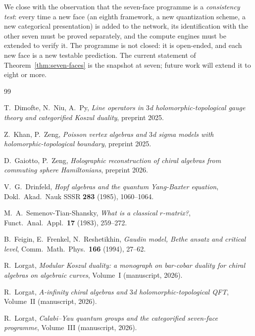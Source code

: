 \documentclass[11pt]{article}
\theoremstyle{plain}
\theoremstyle{definition}
\theoremstyle{remark}
\begin{document}
We close with the observation that the seven-face programme is a
\emph{consistency test}: every time a new face (an eighth framework,
a new quantization scheme, a new categorical presentation) is
added to the network, its identification with the other seven must
be proved separately, and the compute engines must be extended to
verify it. The programme is not closed: it is open-ended, and
each new face is a new testable prediction. The current
statement of Theorem~\ref{thm:seven-faces} is the snapshot at
seven; future work will extend it to eight or more.


\begin{thebibliography}{99}

T.~Dimofte, N.~Niu, A.~Py, \emph{Line operators in $3$d
holomorphic-topological gauge theory and categorified Koszul
duality}, preprint 2025.

Z.~Khan, P.~Zeng, \emph{Poisson vertex algebras and $3$d sigma
models with holomorphic-topological boundary}, preprint 2025.

D.~Gaiotto, P.~Zeng, \emph{Holographic reconstruction of chiral
algebras from commuting sphere Hamiltonians}, preprint 2026.

V.~G.~Drinfeld, \emph{Hopf algebras and the quantum Yang-Baxter
equation}, Dokl.\ Akad.\ Nauk SSSR \textbf{283} (1985), 1060--1064.

M.~A.~Semenov-Tian-Shansky, \emph{What is a classical $r$-matrix?},
Funct.\ Anal.\ Appl.\ \textbf{17} (1983), 259--272.

B.~Feigin, E.~Frenkel, N.~Reshetikhin, \emph{Gaudin model, Bethe
ansatz and critical level}, Comm.\ Math.\ Phys.\ \textbf{166}
(1994), 27--62.

R.~Lorgat, \emph{Modular Koszul duality: a monograph on bar-cobar
duality for chiral algebras on algebraic curves}, Volume~I
(manuscript, 2026).

R.~Lorgat, \emph{$A$-infinity chiral algebras and $3$d
holomorphic-topological QFT}, Volume~II (manuscript, 2026).

R.~Lorgat, \emph{Calabi--Yau quantum groups and the categorified
seven-face programme}, Volume~III (manuscript, 2026).

\end{thebibliography}
\end{document}
